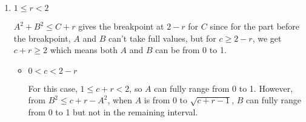 \documentclass[12pt, oneside]{article}
\begin{document}
\begin{enumerate}
{\begin{enumerate}
{\begin{itemize}
                \item {
                    \(1 - r \leq c < 1\)

                    For this case \(c + r > 1\), and \(A\) can range fully from 0 to 1
                    Then, considering \(B^2 \leq c + r - a^2\) we note that when 
                    \(a > \sqrt{c + r - 1}\), \(B\) ranges from 0 to \(\sqrt{c + r - a^2}\)
                    and when \(0 < a leq \sqrt{c + r - 1}\), \(B\) ranges from 0 to 1.

                    \(\therefore\) The required probability is:
                    \[
                        \int_{c = 1 - r}^{1} \int_{a=0}^{\sqrt{c + r - 1}} 
                        \int_{b = 0}^{1} f(a, b, c)\, db\, da\, dc
                        + \int_{c = 1 - r}^{1} \int_{\sqrt{c + r - 1}}^{1} 
                        \int_{b = 0}^{\sqrt{c + r - a^2}} f(a, b, c)\, db\, da\, dc
                    \]
                }
            \end{itemize}

            Totalling up the probabilities for this case, we have
            \begin{align*}
                P(R \leq r) &= \int_{c = 0}^{1 - r} \int_{a=0}^{\sqrt{c + r}} 
                \int_{b = 0}^{\sqrt{c + r - a^2}} f(a, b, c)\, db\, da\, dc \\
                &+ \int_{c = 1 - r}^{1} \int_{a=0}^{\sqrt{c + r - 1}} 
                \int_{b = 0}^{1} f(a, b, c)\, db\, da\, dc \\
                &+ \int_{c = 1 - r}^{1} \int_{\sqrt{c + r - 1}}^{1} 
                \int_{b = 0}^{\sqrt{c + r - a^2}} f(a, b, c)\, db\, da\, dc
            \end{align*}
        }

        \item {
            \(1 \leq r < 2\)

            \(A^2 + B^2 \leq C + r\) gives the breakpoint at \(2 - r\) for \(C\) since
            for the part before the breakpoint, \(A\) and \(B\) can't take full values,
            but for \(c \geq 2 - r\), we get \(c + r \geq 2\) which means both \(A\) and \(B\)
            can be from 0 to 1.

            \begin{itemize}
                \item {
                    \(0 < c < 2 - r\)

                    For this case, \(1 \leq c + r < 2\), so \(A\) can fully range from
                    0 to 1. However, from \(B^2 \leq c + r - A^2\), when \(A\) is from 0 to
                    \(\sqrt{c + r - 1}\), \(B\) can fully range from 0 to 1 but not in the
                    remaining interval.

}
\end{itemize}}
\end{enumerate}}
\end{enumerate}
\end{document}
